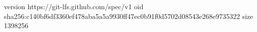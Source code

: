 version https://git-lfs.github.com/spec/v1
oid sha256:c140bf6df3360ef478aba5a5a9930ff47ec0b91f0d5702d08543e268e9735322
size 1398256
